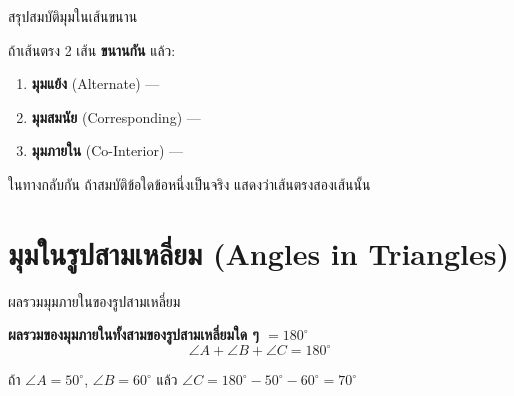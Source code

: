 \documentclass[11pt, aspectratio=169]{beamer}
\begin{document}
\begin{frame}{สรุปสมบัติมุมในเส้นขนาน}
  \begin{explanation}[จำง่าย ๆ]
    ถ้าเส้นตรง 2 เส้น \textbf{ขนานกัน} แล้ว:
    \begin{enumerate}
      \item \textbf{มุมแย้ง} (Alternate) — 
      \item \textbf{มุมสมนัย} (Corresponding) — 
      \item \textbf{มุมภายใน} (Co-Interior) — 
    \end{enumerate}
  \end{explanation}

  \begin{intuition}[กลับกันก็ได้!]
    ในทางกลับกัน ถ้าสมบัติข้อใดข้อหนึ่งเป็นจริง
    แสดงว่าเส้นตรงสองเส้นนั้น 
  \end{intuition}
\end{frame}

\section{มุมในรูปสามเหลี่ยม (Angles in Triangles)}

\begin{frame}{ผลรวมมุมภายในของรูปสามเหลี่ยม}
  \begin{explanation}[ทฤษฎีบท]
    \textbf{ผลรวมของมุมภายในทั้งสามของรูปสามเหลี่ยมใด ๆ $= 180^\circ$}
    \[
      \angle A + \angle B + \angle C = 180^\circ
    \]
  \end{explanation}

  \begin{center}
  \end{center}

  \begin{exambox}[ตัวอย่าง]
    ถ้า $\angle A = 50^\circ$, $\angle B = 60^\circ$ แล้ว $\angle C = 180^\circ - 50^\circ - 60^\circ = 70^\circ$
  \end{exambox}
\end{frame}
\end{document}
